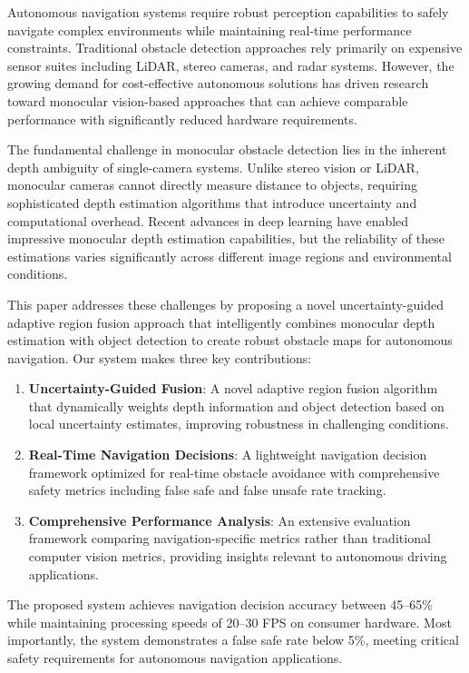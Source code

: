 \documentclass[12pt,oneside]{book}
\begin{document}
Autonomous navigation systems require robust perception capabilities to safely navigate complex environments while maintaining real-time performance constraints. Traditional obstacle detection approaches rely primarily on expensive sensor suites including LiDAR, stereo cameras, and radar systems. However, the growing demand for cost-effective autonomous solutions has driven research toward monocular vision-based approaches that can achieve comparable performance with significantly reduced hardware requirements.

The fundamental challenge in monocular obstacle detection lies in the inherent depth ambiguity of single-camera systems. Unlike stereo vision or LiDAR, monocular cameras cannot directly measure distance to objects, requiring sophisticated depth estimation algorithms that introduce uncertainty and computational overhead. Recent advances in deep learning have enabled impressive monocular depth estimation capabilities, but the reliability of these estimations varies significantly across different image regions and environmental conditions.

This paper addresses these challenges by proposing a novel uncertainty-guided adaptive region fusion approach that intelligently combines monocular depth estimation with object detection to create robust obstacle maps for autonomous navigation. Our system makes three key contributions:

\begin{enumerate}
\item \textbf{Uncertainty-Guided Fusion}: A novel adaptive region fusion algorithm that dynamically weights depth information and object detection based on local uncertainty estimates, improving robustness in challenging conditions.

\item \textbf{Real-Time Navigation Decisions}: A lightweight navigation decision framework optimized for real-time obstacle avoidance with comprehensive safety metrics including false safe and false unsafe rate tracking.

\item \textbf{Comprehensive Performance Analysis}: An extensive evaluation framework comparing navigation-specific metrics rather than traditional computer vision metrics, providing insights relevant to autonomous driving applications.
\end{enumerate}
\vspace{3cm}The proposed system achieves navigation decision accuracy between 45--65\% while maintaining processing speeds of 20--30 FPS on consumer hardware. Most importantly, the system demonstrates a false safe rate below 5\%, meeting critical safety requirements for autonomous navigation applications.
\end{document}
